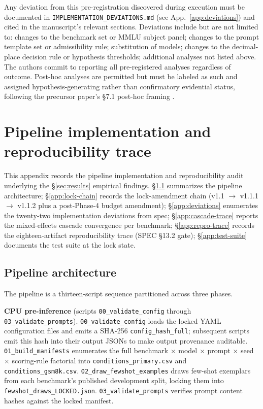 \documentclass[11pt]{article}
\begin{document}
Any deviation from this pre-registration discovered during execution must be documented in \texttt{IMPLEMENTATION\_DEVIATIONS.md} (see App.~\ref{app:deviations}) and cited in the manuscript's relevant sections. Deviations include but are not limited to: changes to the benchmark set or MMLU subject panel; changes to the prompt template set or admissibility rule; substitution of models; changes to the decimal-place decision rule or hypothesis thresholds; additional analyses not listed above. The authors commit to reporting all pre-registered analyses regardless of outcome. Post-hoc analyses are permitted but must be labeled as such and assigned hypothesis-generating rather than confirmatory evidential status, following the precursor paper's §7.1 post-hoc framing \citep{anonymized2026n134}.

\section{Pipeline implementation and reproducibility trace}
\label{app:pipeline}

\sloppy

This appendix records the pipeline implementation and reproducibility audit underlying the §\ref{sec:results} empirical findings. §\ref{app:pipeline-architecture} summarizes the pipeline architecture; §\ref{app:lock-chain} records the lock-amendment chain (v1.1 $\to$ v1.1.1 $\to$ v1.1.2 plus a post-Phase-4 budget amendment); §\ref{app:deviations} enumerates the twenty-two implementation deviations from spec; §\ref{app:cascade-trace} reports the mixed-effects cascade convergence per benchmark; §\ref{app:repro-trace} records the eighteen-artifact reproducibility trace (SPEC §13.2 gate); §\ref{app:test-suite} documents the test suite at the lock state.

\subsection{Pipeline architecture}
\label{app:pipeline-architecture}

The pipeline is a thirteen-script sequence partitioned across three phases.

\textbf{CPU pre-inference} (scripts \texttt{00\_validate\_config} through \texttt{03\_validate\_prompts}). \texttt{00\_validate\_config} loads the locked YAML configuration files and emits a SHA-256 \texttt{config\_hash\_full}; subsequent scripts emit this hash into their output JSONs to make output provenance auditable. \texttt{01\_build\_manifests} enumerates the full benchmark $\times$ model $\times$ prompt $\times$ seed $\times$ scoring-rule factorial into \texttt{conditions\_primary.csv} and \texttt{conditions\_gsm8k.csv}. \texttt{02\_draw\_fewshot\_examples} draws few-shot exemplars from each benchmark's published development split, locking them into \texttt{fewshot\_draws\_LOCKED.json}. \texttt{03\_validate\_prompts} verifies prompt content hashes against the locked manifest.
\end{document}
